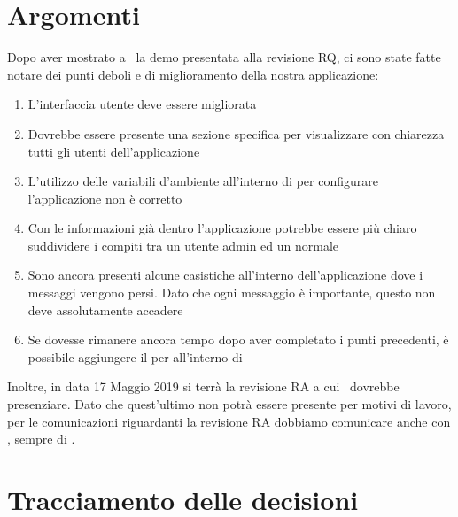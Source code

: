     \section{Argomenti}
    Dopo aver mostrato a \DZ~la demo presentata alla revisione RQ, ci sono state fatte notare dei punti deboli e di miglioramento della nostra applicazione:
    \begin{enumerate}
        \item L'interfaccia utente deve essere migliorata
        \item Dovrebbe essere presente una sezione specifica per visualizzare con chiarezza tutti gli utenti dell'applicazione
        \item L'utilizzo delle variabili d'ambiente all'interno di  per configurare l'applicazione non è corretto
        \item Con le informazioni già dentro l'applicazione potrebbe essere più chiaro suddividere i compiti tra un utente admin ed un normale
        \item Sono ancora presenti alcune casistiche all'interno dell'applicazione dove i messaggi vengono persi. Dato che ogni messaggio è importante, questo non deve assolutamente accadere
        \item Se dovesse rimanere ancora tempo dopo aver completato i punti precedenti, è possibile aggiungere il  per  all'interno di \progetto
    \end{enumerate} 

    Inoltre, in data 17 Maggio 2019 si terrà la revisione RA a cui \DZ~dovrebbe presenziare. Dato che quest'ultimo non potrà essere presente per motivi di lavoro, per le comunicazioni riguardanti la revisione RA dobbiamo comunicare anche con \LuC, sempre di \II.

    \section{Tracciamento delle decisioni}

